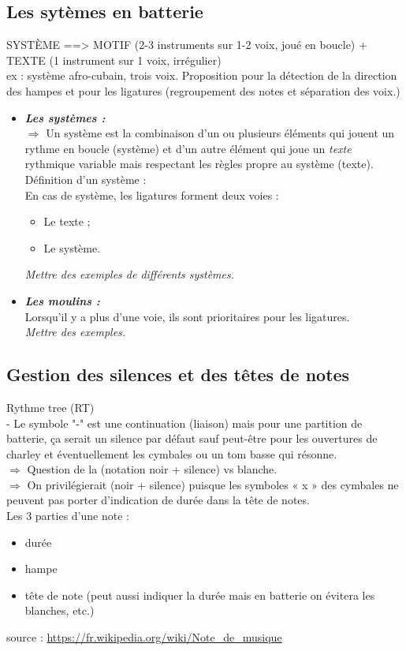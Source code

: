 \subsection*{Les sytèmes en batterie}
SYSTÈME ==> MOTIF (2-3 instruments sur 1-2 voix, joué en boucle) + TEXTE (1 instrument sur 1 voix, irrégulier)\\
ex : système afro-cubain, trois voix.
Proposition pour la détection de la direction des hampes et pour les ligatures (regroupement des notes et séparation des voix.)
\begin{itemize}
	\item \textbf{\textit{Les systèmes :}}\\
	$\Rightarrow$ Un système est la combinaison d’un ou plusieurs éléments qui jouent un rythme en boucle (système) et d’un autre élément qui joue un \textit{texte} rythmique variable mais respectant les règles propre au système (texte).\\
	Définition d’un système :\\
	
	En cas de système, les ligatures forment deux voies :
	\begin{itemize}
		\item Le texte ;
		\item Le système.
	\end{itemize}
	\textit{Mettre des exemples de différents systèmes.}
	\item \textbf{\textit{Les moulins :}}\\
	Lorsqu’il y a plus d’une voie, ils sont prioritaires pour les ligatures.\\
	\textit{Mettre des exemples.}\\
\end{itemize}
\subsection*{Gestion des silences et des têtes de notes}
Rythme tree (RT)\\
- Le symbole "-" est une continuation (liaison) mais pour une partition de
batterie, ça serait un silence par défaut sauf peut-être pour les ouvertures
de charley et éventuellement les cymbales ou un tom basse qui résonne.\\
$\Rightarrow$ Question de la (notation noir + silence) vs blanche.\\
$\Rightarrow$ On privilégierait (noir + silence) puisque les symboles « x » des cymbales ne
peuvent pas porter d’indication de durée dans la tête de notes.\\
Les 3 parties d’une note :
\begin{itemize}
	\item durée
	\item hampe
	\item tête de note (peut aussi indiquer la durée mais en batterie on évitera les blanches, etc.)
\end{itemize}
source : \url{https://fr.wikipedia.org/wiki/Note_de_musique}\\\\
